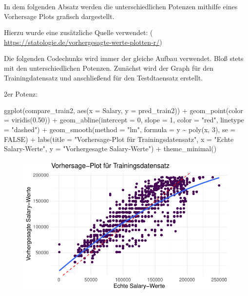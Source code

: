 \documentclass[
  letterpaper,
  DIV=11,
  numbers=noendperiod]{scrartcl}
\newenvironment{Shaded}{\begin{snugshade}}{\end{snugshade}}
\newcommand{\AttributeTok}[1]{\textcolor[rgb]{0.40,0.45,0.13}{#1}}
\newcommand{\ConstantTok}[1]{\textcolor[rgb]{0.56,0.35,0.01}{#1}}
\newcommand{\DecValTok}[1]{\textcolor[rgb]{0.68,0.00,0.00}{#1}}
\newcommand{\FloatTok}[1]{\textcolor[rgb]{0.68,0.00,0.00}{#1}}
\newcommand{\FunctionTok}[1]{\textcolor[rgb]{0.28,0.35,0.67}{#1}}
\newcommand{\NormalTok}[1]{\textcolor[rgb]{0.00,0.23,0.31}{#1}}
\newcommand{\SpecialCharTok}[1]{\textcolor[rgb]{0.37,0.37,0.37}{#1}}
\newcommand{\StringTok}[1]{\textcolor[rgb]{0.13,0.47,0.30}{#1}}
\begin{document}
In dem folgenden Absatz werden die unterschiedlichen Potenzen mithilfe
eines Vorhersage Plots grafisch dargestellt.

Hierzu wurde eine zusätzliche Quelle verwendet: (
\url{https://statologie.de/vorhergesagte-werte-plotten-r/})

Die folgenden Codechunks wird immer der gleiche Aufbau verwendet. Bloß
stets mit den unterschiedlichen Potenzen. Zunächst wird der Graph für
den Trainingdatensatz und anschließend für den Testdtaensatz erstellt.

2er Potenz:

\begin{Shaded}
\begin{Highlighting}[]
\FunctionTok{ggplot}\NormalTok{(compare\_train2, }\FunctionTok{aes}\NormalTok{(}\AttributeTok{x =}\NormalTok{ Salary, }\AttributeTok{y =}\NormalTok{ pred\_train2)) }\SpecialCharTok{+}
  \FunctionTok{geom\_point}\NormalTok{(}\AttributeTok{color =} \FunctionTok{viridis}\NormalTok{(}\FloatTok{0.50}\NormalTok{)) }\SpecialCharTok{+}
  \FunctionTok{geom\_abline}\NormalTok{(}\AttributeTok{intercept =} \DecValTok{0}\NormalTok{, }\AttributeTok{slope =} \DecValTok{1}\NormalTok{, }\AttributeTok{color =} \StringTok{"red"}\NormalTok{, }\AttributeTok{linetype =} \StringTok{"dashed"}\NormalTok{) }\SpecialCharTok{+}
  \FunctionTok{geom\_smooth}\NormalTok{(}\AttributeTok{method =} \StringTok{"lm"}\NormalTok{, }\AttributeTok{formula =}\NormalTok{ y }\SpecialCharTok{\textasciitilde{}} \FunctionTok{poly}\NormalTok{(x, }\DecValTok{3}\NormalTok{), }\AttributeTok{se =} \ConstantTok{FALSE}\NormalTok{) }\SpecialCharTok{+}
  \FunctionTok{labs}\NormalTok{(}\AttributeTok{title =} \StringTok{"Vorhersage{-}Plot für Trainingsdatensatz"}\NormalTok{,}
       \AttributeTok{x =} \StringTok{"Echte Salary{-}Werte"}\NormalTok{,}
       \AttributeTok{y =} \StringTok{"Vorhergesagte Salary{-}Werte"}\NormalTok{) }\SpecialCharTok{+}
  \FunctionTok{theme\_minimal}\NormalTok{()}
\end{Highlighting}
\end{Shaded}

\begin{figure}[H]

{\centering \includegraphics{main_doc_files/figure-pdf/unnamed-chunk-146-1.pdf}

}

\end{figure}
\end{document}
